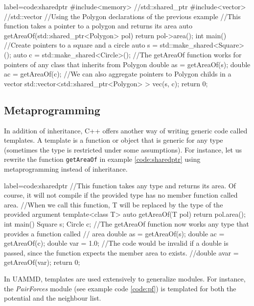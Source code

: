 \documentclass[ twoside,openright,titlepage,numbers=noenddot,%
headinclude,footinclude,cleardoublepage=empty,abstract=on,
BCOR=5mm,paper=a4,fontsize=11pt, dvipsnames
]{scrreprt}
\def\ucpp{uammd_cpp_lexer.py:UAMMDCppLexer -x}
\newcommand{\uammd}{\gls{UAMMD}\xspace}
\begin{document}
\begin{code2} {label=code:sharedptr}
  #include<memory> //std::shared_ptr
  #include<vector> //std::vector
  //Using the Polygon declarations of the previous example
  //This function takes a pointer to a polygon and returns its area
  auto getAreaOf(std::shared_ptr<Polygon> pol){
    return pol->area();
  }
  int main(){
    //Create pointers to a square and a circle
    auto s = std::make_shared<Square>();
    auto c = std::make_shared<Circle>();
    //The getAreaOf function works for pointers of any class that inherits from Polygon
    double as = getAreaOf(s);
    double ac = getAreaOf(c);
    //We can also aggregate pointers to Polygon childs in a vector
    std::vector<std::shared_ptr<Polygon> > vec({s, c});
    return 0;  
  }
\end{code2}

\subsection*{Metaprogramming}
In addition of inheritance, C++ offers another way of writing generic code called templates. A template is a function or object that is generic for any type (sometimes the type is restricted under some assumptions). For instance, let us rewrite the function \texttt{getAreaOf} in example \ref{code:sharedptr} using metaprogramming instead of inheritance.

\begin{code2} {label=code:sharedptr}
  //This function takes any type and returns its area. Of course, it will not compile if the provided type has no member function called area.
  //When we call this function, T will be replaced by the type of the provided argument
  template<class T>
  auto getAreaOf(T pol){
    return pol.area();
  }
  int main(){
    Square s;
    Circle c;
    //The getAreaOf function now works any type that provides a function called
    // area
    double as = getAreaOf(s);
    double ac = getAreaOf(c);    
    double var = 1.0;
    //The code would be invalid if a double is passed, since the function expects the member area to exists.
    //double avar = getAreaOf(var);
    return 0;  
  }
\end{code2}

In \uammd, templates are used extensively to generalize modules. For instance, the \emph{PairForces} module (see example code \ref{code:pf}) is templated for both the potential and the neighbour list.
\end{document}
